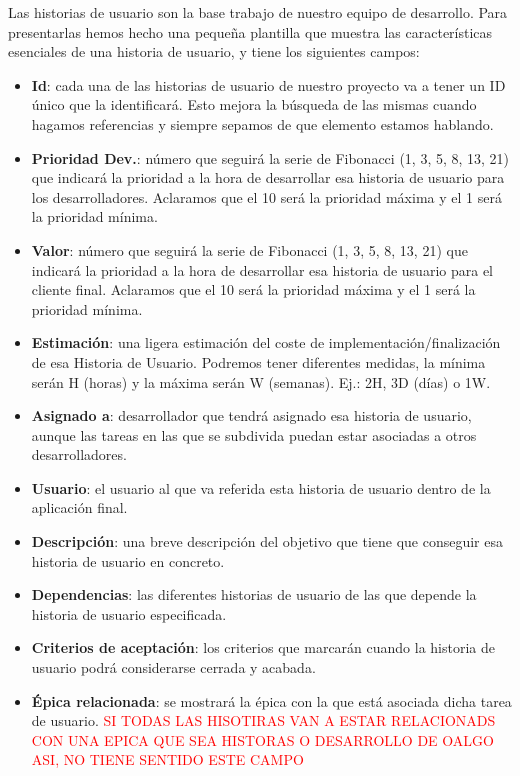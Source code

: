 Las historias de usuario son la base trabajo de nuestro equipo de desarrollo. Para presentarlas hemos hecho una pequeña plantilla que muestra las características esenciales de una historia de usuario, y tiene los siguientes campos:
\begin{itemize}
    \item \textbf{Id}: cada una de las historias de usuario de nuestro proyecto va a tener un ID único que la identificará. Esto mejora la búsqueda de las mismas cuando hagamos referencias y siempre sepamos de que elemento estamos hablando. 
    
    \item \textbf{Prioridad Dev.}: número que seguirá la serie de Fibonacci (1, 3, 5, 8, 13, 21) que indicará la prioridad a la hora de desarrollar esa historia de usuario para los desarrolladores. Aclaramos que el 10 será la prioridad máxima y el 1 será la prioridad mínima. 
    
    \item \textbf{Valor}: número que seguirá la serie de Fibonacci (1, 3, 5, 8, 13, 21) que indicará la prioridad a la hora de desarrollar esa historia de usuario para el cliente final. Aclaramos que el 10 será la prioridad máxima y el 1 será la prioridad mínima. 
    
    \item \textbf{Estimación}: una ligera estimación del coste de implementación/finalización de esa Historia de Usuario. Podremos tener diferentes medidas, la mínima serán H (horas) y la máxima serán W (semanas). Ej.: 2H, 3D (días) o 1W. 
    
    \item \textbf{Asignado a}: desarrollador que tendrá asignado esa historia de usuario, aunque las tareas en las que se subdivida puedan estar asociadas a otros desarrolladores. 
    
    \item \textbf{Usuario}: el usuario al que va referida esta historia de usuario dentro de la aplicación final.
    
    \item \textbf{Descripción}: una breve descripción del objetivo que tiene que conseguir esa historia de usuario en concreto.
    
    \item \textbf{Dependencias}: las diferentes historias de usuario de las que depende la historia de usuario especificada. 
    
    \item \textbf{Criterios de aceptación}: los criterios que marcarán cuando la historia de usuario podrá considerarse cerrada y acabada. 
    
    \item \textbf{Épica relacionada}: se mostrará la épica con la que está asociada dicha tarea de usuario. \textcolor{red}{SI TODAS LAS HISOTIRAS VAN A ESTAR RELACIONADS CON UNA EPICA QUE SEA HISTORAS O DESARROLLO DE OALGO ASI, NO TIENE SENTIDO ESTE CAMPO}
    

\end{itemize}

